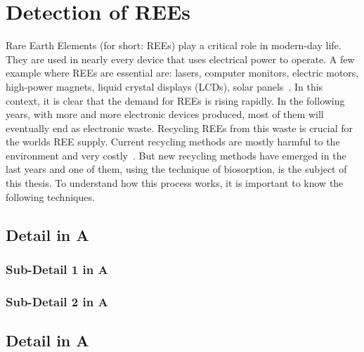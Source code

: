 \chapter{Detection of REEs\authorB{}}

Rare Earth Elements (for short: REEs) play a critical role in modern-day life.
They are used in nearly every device that uses electrical power to operate.
A few example where REEs are essential are: lasers, computer monitors, electric motors, high-power magnets, liquid crystal displays (LCDs), solar panels~\cite{usageofrees}.
In this context, it is clear that the demand for REEs is rising rapidly.
In the following years, with more and more electronic devices produced, most of them will eventually end as electronic waste.
Recycling REEs from this waste is crucial for the worlds REE supply.
Current recycling methods are mostly harmful to the environment and very costly~\cite{recyclingcurrent}.
But new recycling methods have emerged in the last years and one of them, using the technique of biosorption, is the subject of this thesis.
To understand how this process works, it is important to know the following techniques.


\section{Detail in A}

\subsection{Sub-Detail 1 in A}

\subsection{Sub-Detail 2 in A}


\section{Detail in A}
